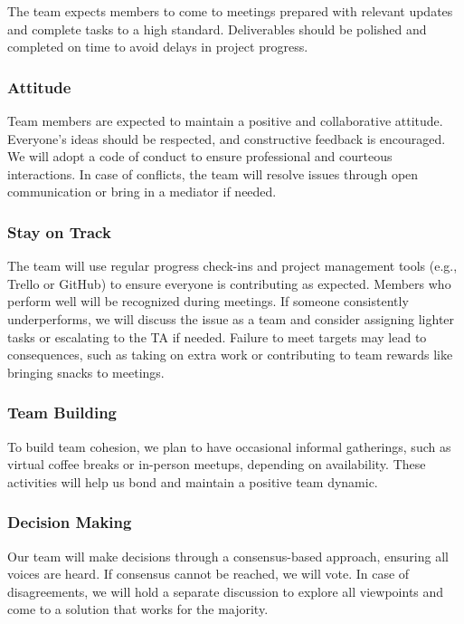\documentclass{article}
\begin{document}
The team expects members to come to meetings prepared with relevant updates and complete tasks
to a high standard. Deliverables should be polished and completed on time to avoid delays in
project progress.

\subsubsection*{Attitude}

Team members are expected to maintain a positive and collaborative attitude. Everyone’s ideas
should be respected, and constructive feedback is encouraged. We will adopt a code of conduct
to ensure professional and courteous interactions. In case of conflicts, the team will resolve
issues through open communication or bring in a mediator if needed.

\subsubsection*{Stay on Track}

The team will use regular progress check-ins and project management tools (e.g., Trello or GitHub)
to ensure everyone is contributing as expected. Members who perform well will be recognized during
meetings. If someone consistently underperforms, we will discuss the issue as a team and consider
assigning lighter tasks or escalating to the TA if needed. Failure to meet targets may lead to
consequences, such as taking on extra work or contributing to team rewards like bringing snacks to meetings.

\subsubsection*{Team Building}

To build team cohesion, we plan to have occasional informal gatherings, such as virtual coffee breaks
or in-person meetups, depending on availability. These activities will help us bond and maintain a 
positive team dynamic.

\subsubsection*{Decision Making} 

Our team will make decisions through a consensus-based approach, ensuring all voices are heard. If
consensus cannot be reached, we will vote. In case of disagreements, we will hold a separate discussion
to explore all viewpoints and come to a solution that works for the majority.
\end{document}
